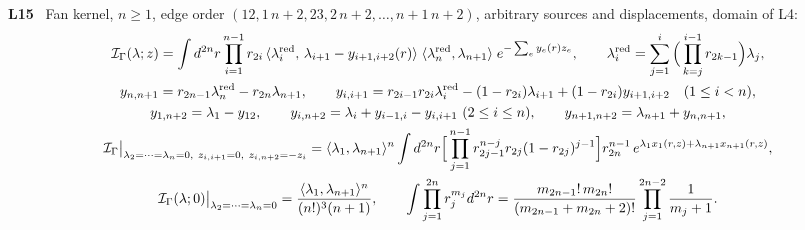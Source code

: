 \documentclass[10pt,a4paper]{article}
\numberwithin{equation}{section}
\newcommand{\cI}{\mathcal I}
\newcommand{\br}[1]{\langle #1\rangle}
\newcommand{\LL}[2]{\textsf{L}(#1){\scriptsize\,\texttt{#2}}}
\newcommand{\LT}[3]{\textsf{L}\,#1\,#2{\scriptsize\,\texttt{#3}}}
\newcommand{\rid}[1]{\par\medskip\noindent\textbf{#1}\ }
\newcommand{\ptr}[2]{\par\nopagebreak{\footnotesize\raggedleft[\,#1\ $\mid$\ #2\,]\par}}
\newcommand{\st}[1]{\textsf{#1}}
\begin{document}
\rid{L15} Fan kernel, $n\ge1$, edge order $(12,1\,n{+}2,23,2\,n{+}2,\dots,n{+}1\,n{+}2)$, arbitrary sources and displacements, domain of L4:
\begin{gather*}
\cI_\Gamma(\lambda;z)=\int d^{2n}r\prod_{i=1}^{n-1}r_{2i}\,\br{\lambda_i^{\rm red},\,\lambda_{i+1}-y_{i+1,i+2}(r)}\;\br{\lambda_n^{\rm red},\lambda_{n+1}}\;e^{-\sum_ey_e(r)z_e},\qquad
\lambda_i^{\rm red}=\sum_{j=1}^i\Big(\prod_{k=j}^{i-1}r_{2k-1}\Big)\lambda_j,\\
y_{n,n+1}=r_{2n-1}\lambda_n^{\rm red}-r_{2n}\lambda_{n+1},\qquad
y_{i,i+1}=r_{2i-1}r_{2i}\lambda_i^{\rm red}-(1-r_{2i})\lambda_{i+1}+(1-r_{2i})y_{i+1,i+2}\quad(1\le i<n),\\
y_{1,n+2}=\lambda_1-y_{12},\qquad y_{i,n+2}=\lambda_i+y_{i-1,i}-y_{i,i+1}\ (2\le i\le n),\qquad y_{n+1,n+2}=\lambda_{n+1}+y_{n,n+1},\\
\cI_\Gamma\big|_{\lambda_2=\dots=\lambda_n=0,\ z_{i,i+1}=0,\ z_{i,n+2}=-z_i}=\br{\lambda_1,\lambda_{n+1}}^n\int d^{2n}r\Big[\prod_{j=1}^{n-1}r_{2j-1}^{n-j}r_{2j}(1-r_{2j})^{j-1}\Big]r_{2n}^{n-1}\,e^{\lambda_1x_1(r,z)+\lambda_{n+1}x_{n+1}(r,z)},\\
\cI_\Gamma(\lambda;0)\big|_{\lambda_2=\dots=\lambda_n=0}=\frac{\br{\lambda_1,\lambda_{n+1}}^n}{(n!)^3(n+1)},\qquad
\int\prod_{j=1}^{2n}r_j^{m_j}d^{2n}r=\frac{m_{2n-1}!\,m_{2n}!}{(m_{2n-1}+m_{2n}+2)!}\prod_{j=1}^{2n-2}\frac1{m_j+1}.
\end{gather*}
\ptr{\LT{Thm}{5.1}{thm-fan-kernel} \LL{5.2}{eq-1-40}, \LL{5.3}{eq-1-38}, \LL{5.4}{eq-1-39}, \LL{5.5}{eq-1-41}, \LL{5.6}{eq-1-42}; \LL{5.21}{eq-B-fan-first-cycle}, \LL{5.22}{eq-B-fan-general-fractions}, \LL{5.27}{eq-1-44}; summary \LT{Thm}{2.5}{thm-sum-all-kernels} \LL{2.42}{eq-sum-fan-kernel-explicit}}{\st{P}; \st{C}: $n=1,2,3$ agree with \textsf{Op} (4.20), (4.44), (4.67) and GWW \S\S4.4--4.6 (footnote to (5.6)); value \st{E} $n\le6$: $\tfrac12,\tfrac1{24},\tfrac1{864},\tfrac1{69120},\dots$; \st{X}: density (5.2) and currents (5.3), general sources, $n\le4$}
\end{document}

